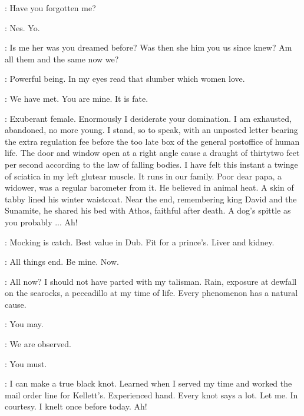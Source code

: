 \Fan:
Have you forgotten me?

\Bloom:
Nes. Yo.

\Fan:
Is me her was you dreamed before?
Was then she him you us since knew?
Am all them and the same now we?


\Bloom:
Powerful being.
In my eyes read that slumber which women love.

\Fan:
We have met.
You are mine.
It is fate.

\Bloom:
Exuberant female.
Enormously I desiderate your domination.
I am exhausted, abandoned, no more young.
I stand, so to speak, with an unposted letter
bearing the extra regulation fee
before the too late box of the general postoffice of human life.
The door and window open at a right angle
cause a draught of thirtytwo feet per second
according to the law of falling bodies.
I have felt this instant a twinge of sciatica in my left glutear muscle.
It runs in our family.
Poor dear papa, a widower, was a regular barometer from it.
He believed in animal heat.
A skin of tabby lined his winter waistcoat.
Near the end, remembering king David and the Sunamite,
he shared his bed with Athos, faithful after death.
A dog's spittle as you probably ...
Ah!

\Richie:
Mocking is catch.
Best value in Dub.
Fit for a prince's.
Liver and kidney.

\Fan:
All things end.
Be mine.
Now.

\Bloom:
All now?
I should not have parted with my talisman.
Rain, exposure at dewfall on the searocks, a peccadillo at my time of life.
Every phenomenon has a natural cause.

\Fan:
You may.

\Bloom:
We are observed.

\Fan:
You must.

\Bloom:
I can make a true black knot.
Learned when I served my time and worked the mail order line for Kellett's.
Experienced hand.
Every knot says a lot.
Let me.
In courtesy.
I knelt once before today.
Ah!

